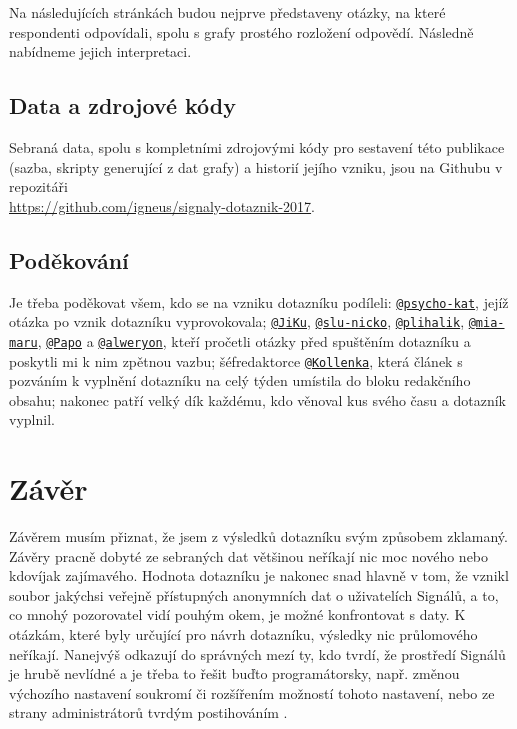 \documentclass[12pt, a4paper, twoside]{article}
\makeatletter
\newcommand{\suser}[1]{\href{https://www.signaly.cz/#1}{\texttt{@#1}}}
\makeatother
\begin{document}
Na následujících stránkách budou nejprve představeny otázky,
na které respondenti odpovídali, spolu s grafy prostého
rozložení odpovědí. Následně nabídneme jejich interpretaci.

\subsection*{Data a zdrojové kódy}

Sebraná data, spolu s kompletními zdrojovými kódy pro sestavení
této publikace (sazba, skripty generující z dat grafy)
a historií jejího vzniku,
jsou na Githubu v repozitáři\\
\url{https://github.com/igneus/signaly-dotaznik-2017}.

\subsection*{Poděkování}

Je třeba poděkovat všem, kdo se na vzniku dotazníku podíleli:
\suser{psycho-kat}, jejíž otázka po 
vznik dotazníku vyprovokovala;
\suser{JiKu}, \suser{slu-nicko}, \suser{plihalik}, \suser{mia-maru},
\suser{Papo} a \suser{alweryon}, kteří pročetli otázky před spuštěním
dotazníku a poskytli mi k nim zpětnou vazbu;
šéfredaktorce \suser{Kollenka}, která článek s pozváním k vyplnění
dotazníku na celý týden umístila do bloku redakčního obsahu;
nakonec patří velký dík každému, kdo věnoval kus svého času
a dotazník vyplnil.











\section{Závěr}

Závěrem musím přiznat, že jsem z výsledků dotazníku svým způsobem
zklamaný. Závěry pracně dobyté ze sebraných dat většinou neříkají
nic moc nového nebo kdovíjak zajímavého. Hodnota dotazníku je
nakonec snad hlavně v tom, že vznikl soubor jakýchsi veřejně přístupných
anonymních dat o uživatelích Signálů,
a to, co mnohý pozorovatel vidí pouhým okem, je možné konfrontovat
s daty. K otázkám, které byly určující pro návrh dotazníku,
výsledky nic průlomového neříkají.
Nanejvýš odkazují do správných mezí ty, kdo tvrdí, že prostředí
Signálů je hrubě nevlídné a je třeba to řešit buďto programátorsky,
např. změnou výchozího nastavení soukromí či rozšířením možností
tohoto nastavení, nebo ze strany administrátorů tvrdým postihováním
.
\end{document}
